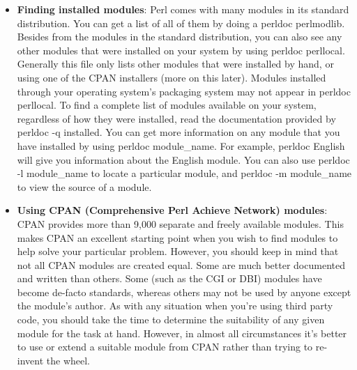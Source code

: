 \documentclass{report}
\begin{document}
\begin{itemize}
\begin{itemize}
                    \bigbreak \noindent 
                    \begin{perlcode}
                    use lib "/path/to/libs";
                    \end{perlcode}
                \item Setting the PERL5LIB environment variable with a colon-separated list of directories to search. Note that if your script is running with taint checks this environment variable is ignored.
            \end{itemize}
            Since use statements occur before regular Perl code is executed, modifying @INC directly usually does not have the desired effect.
        \item \textbf{Finding installed modules}: Perl comes with many modules in its standard distribution. You can get a list of all of them by doing a perldoc perlmodlib. 
            \bigbreak \noindent 
            Besides from the modules in the standard distribution, you can also see any other modules that were installed on your system by using perldoc perllocal. Generally this file only lists other modules that were installed by hand, or using one of the CPAN installers (more on this later). Modules installed through your operating system’s packaging system may not appear in perldoc perllocal.
            \bigbreak \noindent 
            To find a complete list of modules available on your system, regardless of how they were installed, read the documentation provided by perldoc -q installed.
            \bigbreak \noindent 
            You can get more information on any module that you have installed by using perldoc module\_name. For example, perldoc English will give you information about the English module. You can also use perldoc -l module\_name to locate a particular module, and perldoc -m module\_name to view the source of a module.
        \item \textbf{Using CPAN (Comprehensive Perl Achieve Network) modules}:  CPAN provides more than 9,000 separate and freely available modules. This makes CPAN an excellent starting point when you wish to find modules to help solve your particular problem. However, you should keep in mind that not all CPAN modules are created equal. Some are much better documented and written than others. Some (such as the CGI or DBI) modules have become de-facto standards, whereas others may not be used by anyone except the module’s author.
            \bigbreak \noindent 
            As with any situation when you’re using third party code, you should take the time to determine the suitability of any given module for the task at hand. However, in almost all circumstances it’s better to use or extend a suitable module from CPAN rather than trying to re-invent the wheel.

\end{itemize}
\end{document}
